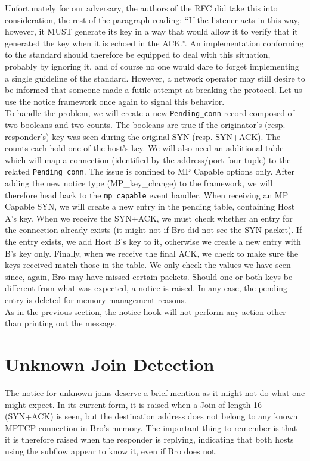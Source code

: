 Unfortunately for our adversary, the authors of the RFC did take this into consideration, the rest of the paragraph reading: ``If the listener acts in this way, however, it MUST generate its key in a way that would allow it to verify that it generated the key when it is echoed in the ACK.''. An implementation conforming to the standard should therefore be equipped to deal with this situation, probably by ignoring it, and of course no one would dare to forget implementing a single guideline of the standard. However, a network operator may still desire to be informed that someone made a futile attempt at breaking the protocol. Let us use the notice framework once again to signal this behavior.\\

To handle the problem, we will create a new \texttt{Pending\_conn} record composed of two booleans and two counts. The booleans are true if the originator's (resp. responder's) key was seen during the original SYN (resp. SYN+ACK). The counts each hold one of the host's key. We will also need an additional table which will map a connection (identified by the address/port four-tuple) to the related \texttt{Pending\_conn}. The issue is confined to MP Capable options only. After adding the new notice type (MP\_key\_change) to the framework, we will therefore head back to the \texttt{mp\_capable} event handler. When receiving an MP Capable SYN, we will create a new entry in the pending table, containing Host A's key. When we receive the SYN+ACK, we must check whether an entry for the connection already exists (it might not if Bro did not see the SYN packet). If the entry exists, we add Host B's key to it, otherwise we create a new entry with B's key only. Finally, when we receive the final ACK, we check to make sure the keys received match those in the table. We only check the values we have seen since, again, Bro may have missed certain packets. Should one or both keys be different from what was expected, a notice is raised. In any case, the pending entry is deleted for memory management reasons. \\

As in the previous section, the notice hook will not perform any action other than printing out the message.

\section{Unknown Join Detection}
The notice for unknown joins deserve a brief mention as it might not do what one might expect. In its current form, it is raised when a Join of length 16 (SYN+ACK) is seen, but the destination address does not belong to any known MPTCP connection in Bro's memory. The important thing to remember is that it is therefore raised when the responder is replying, indicating that both hosts using the subflow appear to know it, even if Bro does not. \\

